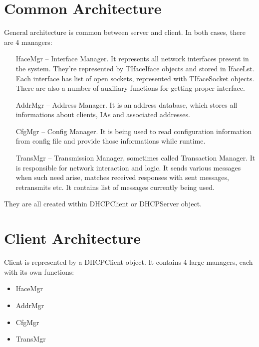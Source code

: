 
\section{Common Architecture}

General architecture is common between server and client. In both
cases, there are 4 managers:
\begin{itemize}
\item[IfaceMgr] -- Interface Manager. It represents all network interfaces present in the
  system. They're represented by TIfaceIface objects and stored in
  IfaceLst. Each interface has list of open sockets, represented with
  TIfaceSocket objects. There are also a number of auxiliary functions
  for getting proper interface. 
\item [AddrMgr] -- Address Manager. It is an address database, which
  stores all informations about clients, IAs and associated addresses.
\item [CfgMgr] -- Config Manager. It is being used to read
  configuration information from config file and provide those
  informations while runtime.
\item [TransMgr] -- Transmission Manager, sometimes called Transaction
  Manager. It is responsible for network interaction and logic. It
  sends various messages when such need arise, matches received
  responses with sent messages, retransmits etc. It contains list of
  messages currently being used.
\end{itemize}

They are all created within DHCPClient or DHCPServer object. 

\section{Client Architecture}

Client is represented by a DHCPClient object. It contains 4 large
managers, each with its own functions:
\begin{itemize}
\item IfaceMgr
\item AddrMgr
\item CfgMgr
\item TransMgr

\end{itemize}

